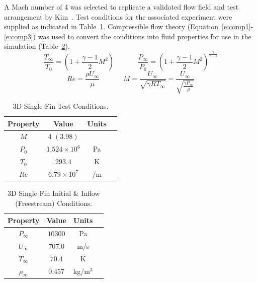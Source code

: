 A Mach number of 4 was selected to replicate a validated flow field and test arrangement by Kim~\cite{kim1991}. Test conditions for the associated experiment were supplied as indicated in Table~\ref{t:tc2:supplied}. Compressible flow theory (Equation~\ref{e:comp1}-\ref{e:comp3}) was used to convert the conditions into fluid properties for use in the simulation (Table~\ref{t:tc2:initial}).
%
\begin{equation}
  \label{e:comp1}
  \frac{T_\infty}{T_0}=\left(1+\frac{\gamma-1}{2}M^2\right) \,\,\,\,\,\,\,\,\,\,\,\,\,\,\,\,\,\,\,\, \frac{P_\infty}{P_0}=\left(1+\frac{\gamma-1}{2}M^2\right)^\frac{\gamma}{\gamma-1}
\end{equation}
\begin{equation}
  \label{e:comp3}
  Re=\frac{\rho U_\infty}{\mu} \,\,\,\,\,\,\,\,\,\,\,\,\,\,\,\,\,\,\,\, M = \frac{U_\infty}{\sqrt{\gamma R T_\infty}} = \frac{U_\infty}{\sqrt{\frac{\gamma P_\infty}{\rho}}}
\end{equation}


\begin{table}[htbp]
  
  \caption{3D Single Fin Test Conditions.}
  \label{t:tc2:supplied}
  \begin{center}
  \begin{tabular}{cccl}
  \hline\hline
     Property  & Value & Units \\
  \hline
    $M$  & $4$ $(3.98)$ & \\
    $P_0$  & $1.524\times10^6$ & Pa  \\
    $T_0$  & $293.4$ & K  \\
    $Re$  & $6.79\times10^7$ & /m  \\
  \hline\hline
  \end{tabular}
  \end{center}
\end{table}
%
%
\begin{table}[htbp]
  
  \caption{3D Single Fin Initial \& Inflow (Freestream) Conditions.}
  \label{t:tc2:initial}
  \begin{center}
  \begin{tabular}{cccl}
  \hline\hline
     Property  & Value & Units \\
  \hline
    $P_\infty$  & $10300$ & Pa  \\
    $U_\infty$  & $707.0$ & m/s  \\
    $T_\infty$  & $70.4$ & K  \\
    $\rho_\infty$  & $0.457$ & kg/m$^3$  \\
  \hline\hline
  \end{tabular}
  \end{center}
\end{table}
%

